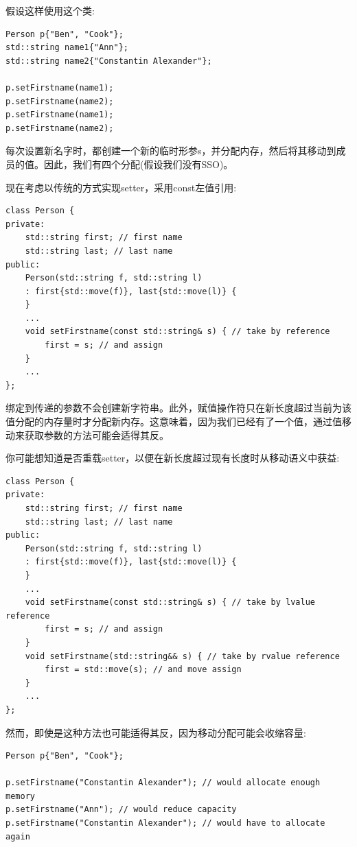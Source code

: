 假设这样使用这个类:\par

\begin{lstlisting}[caption={}]
Person p{"Ben", "Cook"};
std::string name1{"Ann"};
std::string name2{"Constantin Alexander"};

p.setFirstname(name1);
p.setFirstname(name2);
p.setFirstname(name1);
p.setFirstname(name2);
\end{lstlisting}

每次设置新名字时，都创建一个新的临时形参s，并分配内存，然后将其移动到成员的值。因此，我们有四个分配(假设我们没有SSO)。\par

现在考虑以传统的方式实现setter，采用const左值引用:\par

\begin{lstlisting}[caption={}]
class Person {
private:
	std::string first; // first name
	std::string last; // last name
public:
	Person(std::string f, std::string l)
	: first{std::move(f)}, last{std::move(l)} {
	}
	...
	void setFirstname(const std::string& s) { // take by reference
		first = s; // and assign
	}
	...
};
\end{lstlisting}

绑定到传递的参数不会创建新字符串。此外，赋值操作符只在新长度超过当前为该值分配的内存量时才分配新内存。这意味着，因为我们已经有了一个值，通过值移动来获取参数的方法可能会适得其反。\par

你可能想知道是否重载setter，以便在新长度超过现有长度时从移动语义中获益:\par

\begin{lstlisting}[caption={}]
class Person {
private:
	std::string first; // first name
	std::string last; // last name
public:
	Person(std::string f, std::string l)
	: first{std::move(f)}, last{std::move(l)} {
	}
	...
	void setFirstname(const std::string& s) { // take by lvalue reference
		first = s; // and assign
	}
	void setFirstname(std::string&& s) { // take by rvalue reference
		first = std::move(s); // and move assign
	}
	...
};
\end{lstlisting}

然而，即使是这种方法也可能适得其反，因为移动分配可能会收缩容量:\par

\begin{lstlisting}[caption={}]
Person p{"Ben", "Cook"};

p.setFirstname("Constantin Alexander"); // would allocate enough memory
p.setFirstname("Ann"); // would reduce capacity
p.setFirstname("Constantin Alexander"); // would have to allocate again
\end{lstlisting}

